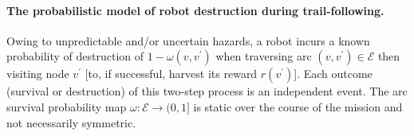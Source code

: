 \documentclass[11pt, oneside]{article}
\begin{document}
\paragraph{The probabilistic model of robot destruction during trail-following.} 
Owing to unpredictable and/or uncertain hazards, a robot incurs a known probability of destruction of  $1 - \omega(v, v^\prime)$ when traversing arc $(v, v^\prime) \in \mathcal{E}$ then visiting node $v^\prime$ [to, if successful, harvest its reward $r(v^\prime)$].
Each outcome (survival or destruction) of this two-step process is an independent event. 
The arc survival probability map $\omega: \mathcal{E} \rightarrow (0, 1]$ is static over the course of the mission and not necessarily symmetric.





\end{document}
